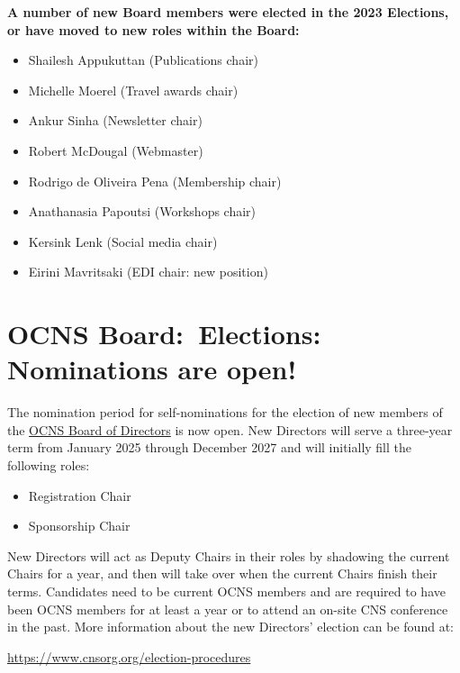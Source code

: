 \documentclass[11pt,a4paper,oneside]{article}
\begin{document}
\textbf{A number of new Board members were elected in the 2023 Elections, or have moved to new roles within the Board:}
\begin{multicols}{2}
  \begin{itemize}
    \item Shailesh Appukuttan (Publications chair)
    \item Michelle Moerel (Travel awards chair)
    \item Ankur Sinha (Newsletter chair)
    \item Robert McDougal (Webmaster)
    \item Rodrigo de Oliveira Pena (Membership chair)
    \item Anathanasia Papoutsi (Workshops chair)
    \item Kersink Lenk (Social media chair)
    \item Eirini Mavritsaki (EDI chair: new position)
  \end{itemize}
\end{multicols}

\section*{OCNS Board:\ Elections: Nominations are open!}%
\sectionauthor{\vspace{-4ex}}
The nomination period for self-nominations for the election of new members of the \href{https://www.cnsorg.org/board-of-directors}{OCNS Board of Directors} is now open.
New Directors will serve a three-year term from January 2025 through December 2027 and will initially fill the following roles:
\begin{multicols}{2}
  \begin{itemize}
    \item Registration Chair
    \item Sponsorship Chair
  \end{itemize}
\end{multicols}

New Directors will act as Deputy Chairs in their roles by shadowing the current Chairs for a year, and then will take over when the current Chairs finish their terms.
Candidates need to be current OCNS members and are required to have been OCNS members for at least a year or to attend an on-site CNS conference in the past.
More information about the new Directors' election can be found at:

\begin{center}
\url{https://www.cnsorg.org/election-procedures}
\end{center}
\end{document}
